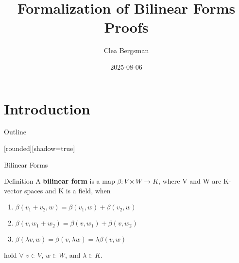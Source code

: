 \documentclass[svgnames]{beamer}
\author{Clea Bergsman}
\date{2025-08-06}
\title{Formalization of Bilinear Forms Proofs}
\begin{document}
\section{Introduction}
\maketitle
\begin{frame}{Outline}
\tableofcontents
\end{frame}

[rounded][shadow=true]

\begin{frame} {Bilinear Forms}
   
\begin{block}{Definition}
A \textbf {bilinear form} is a map $\beta : V\times W \to K $, where V and W are K-vector spaces and K is a field, when
\begin{enumerate}
    \item $\beta (v_1 + v_2 , w) = \beta (v_1 , w) +\beta ( v_2,w)$
    \item $\beta ( v, w_1 + w_2) = \beta (v,w_1) +\beta (v , w_2)$
    \item $\beta(\lambda v, w) = \beta (v, \lambda w) = \lambda \beta (v , w)$
\end{enumerate}
hold $\forall$ $v\in V$, $w\in W$, and $\lambda \in K$.
\end{block}
\end{frame}
\end{document}
